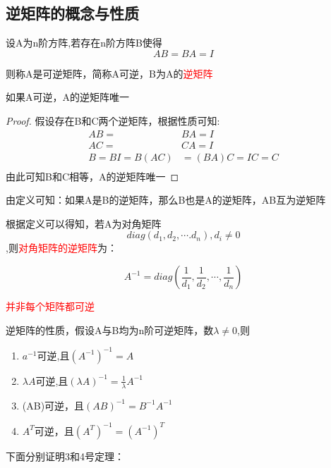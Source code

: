 \subsection{逆矩阵的概念与性质}
\begin{definition}
设A为n阶方阵,若存在n阶方阵B使得
$$
	AB=BA=I
$$

则称A是可逆矩阵，简称A可逆，B为A的\textcolor{red}{逆矩阵}
\end{definition}

\begin{example}
	如果A可逆，A的逆矩阵唯一

	\begin{proof}
		假设存在B和C两个逆矩阵，根据性质可知:
		$$
			\begin{aligned}
				AB=        & BA=I        \\
				AC=        & CA=I        \\
				B=BI=B(AC) & =(BA)C=IC=C \\
			\end{aligned}
		$$
		由此可知B和C相等，A的逆矩阵唯一
	\end{proof}
\end{example}

由定义可知：如果A是B的逆矩阵，那么B也是A的逆矩阵，AB互为逆矩阵


根据定义可以得知，若A为对角矩阵
$$diag(d_1,d_2,\cdots.d_n),d_i\neq 0$$
,则\textcolor{red}{对角矩阵的逆矩阵}为：

$$
	A^{-1}=diag(\frac{1}{d_1},\frac{1}{d_2},\cdots,\frac{1}{d_n})
$$

\textcolor{red}{并非每个矩阵都可逆}

\begin{theorem}

	逆矩阵的性质，假设A与B均为n阶可逆矩阵，数$\lambda\neq 0$,则

	\begin{enumerate}
		\item {$a^{-1}$可逆,且$(A^{-1})^{-1}=A$}
		\item $\lambda A$可逆,且$(\lambda A)^{-1}=\frac{1}{\lambda}A^{-1}$
		\item (AB)可逆，且$(AB)^{-1}=B^{-1}A^{-1}$
		\item $A^T$可逆，且$(A^T)^{-1}=(A^{-1})^T$
	\end{enumerate}
\end{theorem}

下面分别证明3和4号定理：

